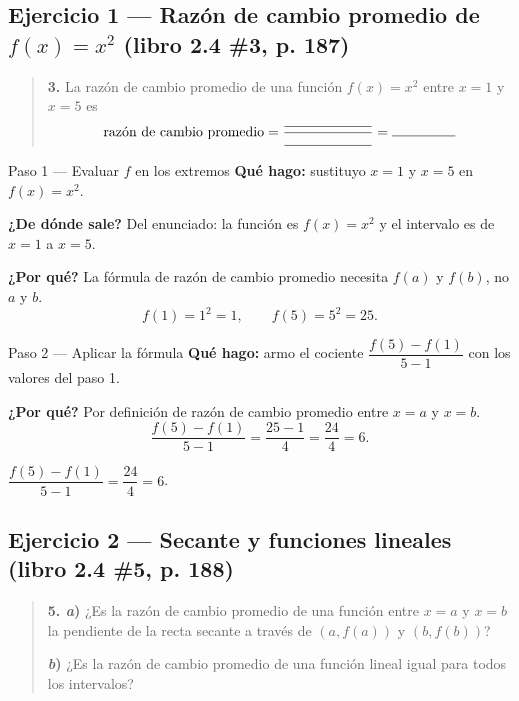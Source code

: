 \documentclass[11pt]{article}
\begin{document}
\subsection*{Ejercicio 1 — Razón de cambio promedio de $f(x)=x^2$ (libro 2.4 \#3, p. 187)}

\begin{quote}
\textbf{3.} La razón de cambio promedio de una función $f(x)=x^2$ entre $x=1$ y $x=5$ es
\[
\text{razón de cambio promedio}=\frac{\rule{2.2cm}{0.4pt}}{\rule{2.2cm}{0.4pt}}=\rule{1.6cm}{0.4pt}
\]
\end{quote}

\begin{paso}{Paso 1 --- Evaluar $f$ en los extremos}
\textbf{Qué hago:} sustituyo $x=1$ y $x=5$ en $f(x)=x^2$.

\textbf{¿De dónde sale?} Del enunciado: la función es $f(x)=x^2$ y el intervalo es de $x=1$ a $x=5$.

\textbf{¿Por qué?} La fórmula de razón de cambio promedio necesita $f(a)$ y $f(b)$, no $a$ y $b$.
\[
f(1)=1^2=1,\qquad f(5)=5^2=25.
\]
\end{paso}

\begin{paso}{Paso 2 --- Aplicar la fórmula}
\textbf{Qué hago:} armo el cociente $\dfrac{f(5)-f(1)}{5-1}$ con los valores del paso 1.

\textbf{¿Por qué?} Por definición de razón de cambio promedio entre $x=a$ y $x=b$.
\[
\frac{f(5)-f(1)}{5-1}=\frac{25-1}{4}=\frac{24}{4}=6.
\]
\end{paso}

\begin{resp}
$\dfrac{f(5)-f(1)}{5-1}=\dfrac{24}{4}=6$.
\end{resp}

\subsection*{Ejercicio 2 — Secante y funciones lineales (libro 2.4 \#5, p. 188)}

\begin{quote}
\textbf{5. \emph{a})} ¿Es la razón de cambio promedio de una función entre $x=a$ y $x=b$ la pendiente de la recta secante a través de $(a,f(a))$ y $(b,f(b))$?

\textbf{\emph{b})} ¿Es la razón de cambio promedio de una función lineal igual para todos los intervalos?
\end{quote}
\end{document}
